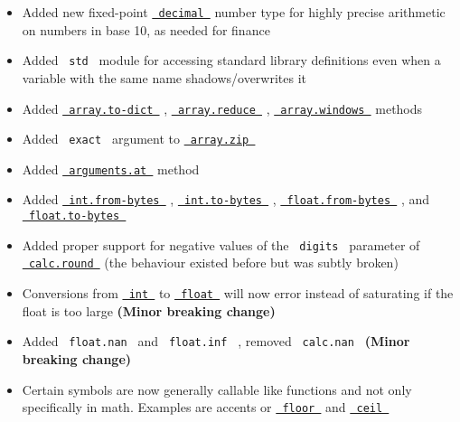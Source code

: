 \begin{itemize}
\tightlist
\item
  Added new fixed-point
  \href{/docs/reference/foundations/decimal/}{\texttt{\ decimal\ }}
  number type for highly precise arithmetic on numbers in base 10, as
  needed for finance
\item
  Added \texttt{\ std\ } module for accessing standard library
  definitions even when a variable with the same name shadows/overwrites
  it
\item
  Added
  \href{/docs/reference/foundations/array/\#definitions-to-dict}{\texttt{\ array.to-dict\ }}
  ,
  \href{/docs/reference/foundations/array/\#definitions-reduce}{\texttt{\ array.reduce\ }}
  ,
  \href{/docs/reference/foundations/array/\#definitions-windows}{\texttt{\ array.windows\ }}
  methods
\item
  Added \texttt{\ exact\ } argument to
  \href{/docs/reference/foundations/array/\#definitions-zip}{\texttt{\ array.zip\ }}
\item
  Added
  \href{/docs/reference/foundations/arguments/\#definitions-at}{\texttt{\ arguments.at\ }}
  method
\item
  Added
  \href{/docs/reference/foundations/int/\#definitions-from-bytes}{\texttt{\ int.from-bytes\ }}
  ,
  \href{/docs/reference/foundations/int/\#definitions-to-bytes}{\texttt{\ int.to-bytes\ }}
  ,
  \href{/docs/reference/foundations/float/\#definitions-from-bytes}{\texttt{\ float.from-bytes\ }}
  , and
  \href{/docs/reference/foundations/float/\#definitions-to-bytes}{\texttt{\ float.to-bytes\ }}
\item
  Added proper support for negative values of the \texttt{\ digits\ }
  parameter of
  \href{/docs/reference/foundations/calc/\#functions-round}{\texttt{\ calc.round\ }}
  (the behaviour existed before but was subtly broken)
\item
  Conversions from
  \href{/docs/reference/foundations/int/}{\texttt{\ int\ }} to
  \href{/docs/reference/foundations/float/}{\texttt{\ float\ }} will now
  error instead of saturating if the float is too large \textbf{(Minor
  breaking change)}
\item
  Added \texttt{\ float.nan\ } and \texttt{\ float.inf\ } , removed
  \texttt{\ calc.nan\ } \textbf{(Minor breaking change)}
\item
  Certain symbols are now generally callable like functions and not only
  specifically in math. Examples are accents or
  \href{/docs/reference/math/lr/\#functions-floor}{\texttt{\ floor\ }}
  and \href{/docs/reference/math/lr/\#functions-ceil}{\texttt{\ ceil\ }}

\end{itemize}
